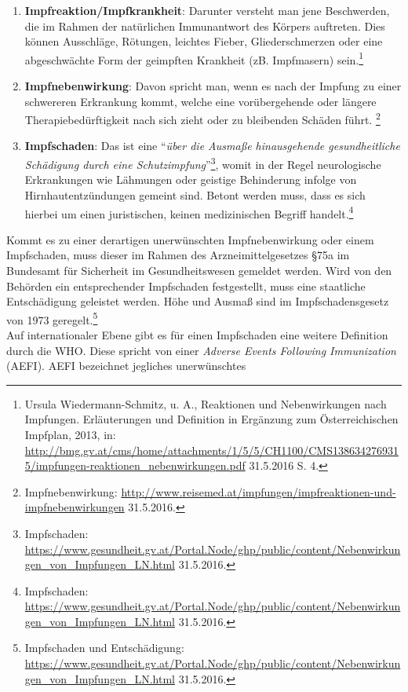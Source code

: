 \documentclass[
    a4paper,
    12pt,
    hyphens,
    chapterprefix=true,
    headheight=33pt,
    footheight=29pt,
    headings=optiontohead, %
]{scrartcl}
\begin{document}
\begin{enumerate}
  \item{\textbf{Impfreaktion/Impfkrankheit}: Darunter versteht man jene Beschwerden, die im Rahmen der natürlichen Immunantwort des Körpers auftreten.
    Dies können Ausschläge, Rötungen, leichtes Fieber, Gliederschmerzen oder eine abgeschwächte Form der geimpften Krankheit
    (zB. Impfmasern) sein.\footnote{Ursula Wiedermann-Schmitz, u. A., Reaktionen und Nebenwirkungen nach Impfungen. Erläuterungen und Definition in
    Ergänzung zum Österreichischen Impfplan, 2013, in: \url{http://bmg.gv.at/cms/home/attachments/1/5/5/CH1100/CMS1386342769315/impfungen-reaktionen_nebenwirkungen.pdf} 31.5.2016 S. 4.}}
  \item{\textbf{Impfnebenwirkung}: Davon spricht man, wenn es nach der Impfung zu einer schwereren Erkrankung kommt, welche eine
    vorübergehende oder längere Therapiebedürftigkeit nach sich zieht oder zu bleibenden Schäden führt.
    \footnote{Impfnebenwirkung: \url{http://www.reisemed.at/impfungen/impfreaktionen-und-impfnebenwirkungen} 31.5.2016.}}
  \item{\textbf{Impfschaden}: Das ist eine "`\textit{über die Ausmaße hinausgehende gesundheitliche Schädigung durch eine
    Schutzimpfung}"'\footnote{Impfschaden: \url{https://www.gesundheit.gv.at/Portal.Node/ghp/public/content/Nebenwirkungen_von_Impfungen_LN.html} 31.5.2016.},
    womit in der Regel neurologische Erkrankungen wie Lähmungen oder geistige Behinderung infolge von Hirnhautentzündungen gemeint sind. Betont werden muss, dass es sich hierbei um einen juristischen, keinen medizinischen Begriff handelt.\footnote{Impfschaden: \url{https://www.gesundheit.gv.at/Portal.Node/ghp/public/content/Nebenwirkungen_von_Impfungen_LN.html} 31.5.2016.}}
\end{enumerate}
Kommt es zu einer derartigen unerwünschten Impfnebenwirkung oder einem Impfschaden, muss dieser im Rahmen des Arzneimittelgesetzes
§75a im Bundesamt für Sicherheit im Gesundheitswesen gemeldet werden. Wird von den Behörden ein
entsprechender Impfschaden festgestellt, muss eine staatliche Entschädigung geleistet werden.
Höhe und Ausmaß sind im Impfschadensgesetz von 1973 geregelt.\footnote{Impfschaden und Entschädigung: \url{https://www.gesundheit.gv.at/Portal.Node/ghp/public/content/Nebenwirkungen_von_Impfungen_LN.html} 31.5.2016.}\\
Auf internationaler Ebene gibt es für einen Impfschaden eine weitere Definition durch die WHO. Diese spricht von einer
\textit{Adverse Events Following Immunization} (AEFI). AEFI bezeichnet jegliches unerwünschtes
\end{document}
